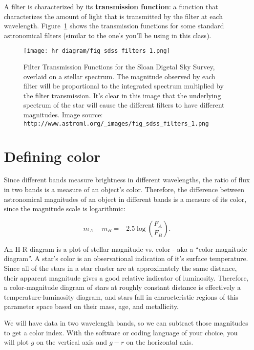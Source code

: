 A filter is characterized by its \textbf{transmission function}: a function that characterizes the amount of light that is transmitted by the filter at each wavelength. Figure~\ref{sdss_filters} shows the transmission functions for some standard astronomical filters (similar to the one's you'll be using in this class).

\begin{figure}
\label{sdss_filters}
\texttt{[image: hr\_diagram/fig\_sdss\_filters\_1.png]}
\caption{Filter Transmission Functions for the Sloan Digetal Sky Survey, overlaid on a stellar spectrum. The magnitude observed by each filter will be proportional to the integrated spectrum multiplied by the filter transmission. It's clear in this image that the underlying spectrum of the star will cause the different filters to have different magnitudes. Image source: \texttt{http://www.astroml.org/\_images/fig\_sdss\_filters\_1.png}}
\end{figure}

\section{Defining color}

Since different bands measure brightness in different wavelengths, the ratio of flux in two bands is a measure of an object's color. Therefore, the difference between astronomical magnitudes of an object in different bands is a measure of its color, since the magnitude scale is logarithmic:

\begin{equation}
m_A - m_B = -2.5\log\left(\frac{F_A}{F_B}\right).
\end{equation}

An H-R diagram is a plot of stellar magnitude vs. color - aka a ``color magnitude diagram''. A star's color is an observational indication of it's surface temperature. Since all of the stars in a star cluster are at approximately the same distance, their apparent magnitude gives a good relative indicator of luminosity. Therefore, a color-magnitude diagram of stars at roughly constant distance is effectively a temperature-luminosity diagram, and stars fall in characteristic regions of this parameter space based on their mass, age, and metallicity.

We will have data in two wavelength bands, so we can subtract those magnitudes to get a color index. With the software or coding language of your choice, you will plot $g$ on the vertical axis and $g - r$ on the horizontal axis.

